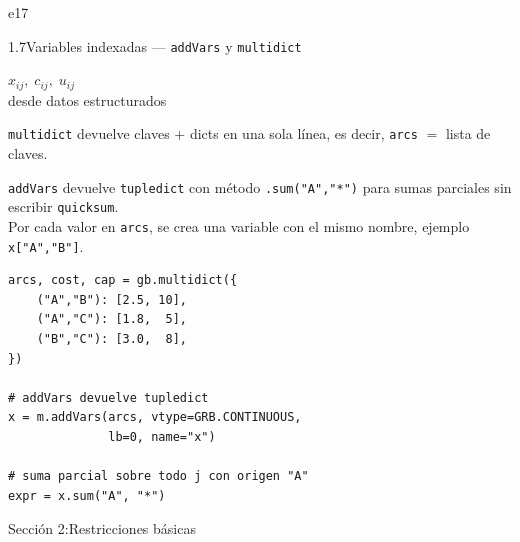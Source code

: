 \documentclass[10pt,a4paper]{article}
\newlength{\mathcolw}
\newlength{\codecolw}
\newcommand{\secheader}[2]{%
  \vspace{10pt}%
  \needspace{6cm}%
  \phantomsection\hypertarget{sec#1}{}%
  \noindent%
  \begin{tcolorbox}[
    colback=sectionbg, colupper=white,
    colframe=sectionbg, sharp corners,
    left=8pt, right=8pt, top=5pt, bottom=5pt,
    fontupper=\large\bfseries\sffamily,
  ]
  Secci\'on #1:\enspace #2
  \end{tcolorbox}%
  \vspace{2pt}%
}
\newcommand{\entryheader}[2][]{%
  \needspace{5cm}%
  \vspace{6pt}%
  \ifx\relax#1\relax\else\phantomsection\hypertarget{#1}{}\fi%
  \noindent%
  \begin{tcolorbox}[
    colback=subsecbg!18,
    colframe=subsecbg!45,
    sharp corners, boxrule=0.4pt,
    left=5pt, right=5pt, top=2pt, bottom=2pt,
    fontupper=\small\bfseries\sffamily,
  ]
  #2
  \end{tcolorbox}%
  \vspace{2pt}%
}
\newcommand{\py}[1]{\texttt{\small #1}}
\begin{document}
\vspace{4pt}

\entryheader[e17]{1.7\quad Variables indexadas --- \py{addVars} y \py{multidict}}
\noindent
\begin{minipage}[t]{\mathcolw}
    \begin{tcolorbox}[mathbox]
        $x_{ij},\; c_{ij},\; u_{ij}$\\[4pt]
        desde datos estructurados
    \end{tcolorbox}
    \vspace{1pt}
    \begin{tcolorbox}[notebox]
        \py{multidict} devuelve claves + dicts en una sola l\'inea, es decir, \py{arcs} $=$ lista de claves.
    \end{tcolorbox}
    \vspace{1pt}
    \begin{tcolorbox}[notebox]
        \py{addVars} devuelve \py{tupledict} con m\'etodo \py{.sum("A","*")} para sumas parciales sin escribir \py{quicksum}.\\
        Por cada valor en \py{arcs}, se crea una variable con el mismo nombre, ejemplo \py{x["A","B"]}.
    \end{tcolorbox}
\end{minipage}\hspace{0.02\textwidth}%
\begin{minipage}[t]{\codecolw}
    \begin{lstlisting}[style=gurobipy]
arcs, cost, cap = gb.multidict({
    ("A","B"): [2.5, 10],
    ("A","C"): [1.8,  5],
    ("B","C"): [3.0,  8],
})

# addVars devuelve tupledict
x = m.addVars(arcs, vtype=GRB.CONTINUOUS,
              lb=0, name="x")

# suma parcial sobre todo j con origen "A"
expr = x.sum("A", "*")
\end{lstlisting}
\end{minipage}

\vspace{4pt}

\secheader{2}{Restricciones b\'asicas}
\end{document}
